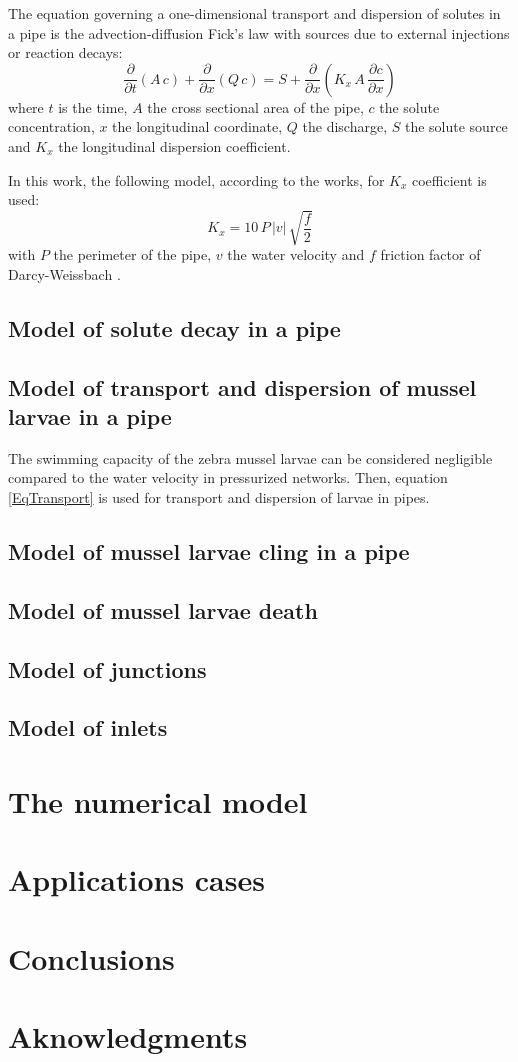 \documentclass[review,authoryear]{elsarticle}
\newcommand{\EQ}[2]{\begin{equation}#1\label{#2}\end{equation}}
\newcommand{\PA}[1]{\left(#1\right)}
\newcommand{\PARTIAL}[2]{\frac{\partial#1}{\partial#2}}
\begin{document}
The equation governing a one-dimensional transport and dispersion of solutes in
a pipe is the advection-diffusion Fick's law with sources due to external
injections or reaction decays:
\EQ{\PARTIAL{}{t}(A\,c)+\PARTIAL{}{x}(Q\,c)
	=S+\PARTIAL{}{x}\PA{K_x\,A\,\PARTIAL{c}{x}}}{EqTransport}
where $t$ is the time, $A$ the cross sectional area of the pipe, $c$ the solute
concentration, $x$ the longitudinal coordinate, $Q$ the discharge, $S$ the
solute source and $K_x$ the longitudinal dispersion coefficient.

In this work, the following model, according to the \citet{Rutherford94} works,
for $K_x$ coefficient is used:
\EQ{K_x=10\,P\,|v|\,\sqrt{\frac{f}{2}}}{EqKx}  
with $P$ the perimeter of the pipe, $v$ the water velocity and $f$ friction
factor of Darcy-Weissbach \citep{Darcy58}.

\subsection{Model of solute decay in a pipe}

\subsection{Model of transport and dispersion of mussel larvae in a pipe}

The swimming capacity of the zebra mussel larvae can be considered negligible
compared to the water velocity in pressurized networks. Then, equation
\ref{EqTransport} is used for transport and dispersion of larvae in pipes.

\subsection{Model of mussel larvae cling in a pipe}

\subsection{Model of mussel larvae death}

\subsection{Model of junctions}

\subsection{Model of inlets}

\section{The numerical model}

\section{Applications cases}

\section{Conclusions}

\section*{Aknowledgments}



\end{document}
